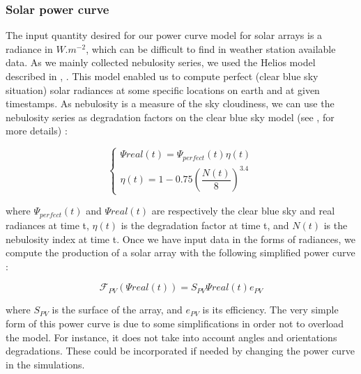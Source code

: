 \documentclass[journal]{IEEEtran}
\begin{document}
\subsubsection{Solar power curve}
The input quantity desired for our power curve model for solar arrays is a radiance in $ W.m^{-2} $, which can be difficult to find in weather station available data. As we mainly collected nebulosity series, we used the Helios model described in \cite{Piedallu2007}, \cite{Piedallu2008}. This model enabled us to compute perfect (clear blue sky situation) solar radiances at some specific locations on earth and at given timestamps. As nebulosity is a measure of the sky cloudiness, we can use the nebulosity series as degradation factors on the clear blue sky model (see \cite{Piedallu2007}, \cite{Piedallu2008} for more details) :


\begin{equation}
\left\{ \begin{array}{lll}
			\Psi{real}(t) = \Psi_{perfect}(t) \eta(t) \\
			\eta(t) = 1-0.75 \left( \dfrac{N(t)}{8} \right)^{3.4}
\end{array} \right.
\end{equation}


\noindent where $ \Psi_{perfect}(t) $ and $ \Psi{real}(t) $ are respectively the clear blue sky and real radiances at time t, $ \eta(t) $ is the degradation factor at time t, and $ N(t) $ is the nebulosity index at time t. Once we have input data in the forms of radiances, we compute the production of a solar array with the following simplified power curve :


\begin{equation}
\mathcal{F}_{PV}(\Psi{real}(t)) =  S_{PV} \Psi{real}(t)  e_{PV}
\end{equation}


\noindent where $ S_{PV} $ is the surface of the array, and $ e_{PV} $ is its efficiency. The very simple form of this power curve is due to some simplifications in order not to overload the model. For instance, it does not take into account angles and orientations degradations. These could be incorporated if needed by changing the power curve in the simulations.
\end{document}
